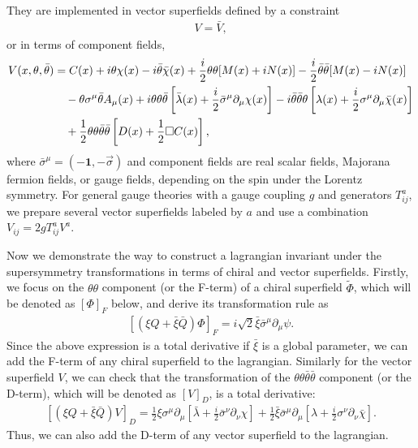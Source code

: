 \documentclass[12pt,twoside,book]{article}
\begin{document}
They are implemented in vector superfields defined by a constraint
\begin{align}
  V = \bar{V},
\end{align}
or in terms of component fields,
\begin{align}
  V(x,\theta,\bar{\theta}) &= C(x) + i\theta\chi(x) -
  i\bar{\theta}\bar{\chi}(x) + \frac{i}{2}\theta\theta [M(x) + iN(x)] -
  \frac{i}{2} \bar{\theta}\bar{\theta} [M(x) - iN(x)] \notag \\
  &\quad - \theta \sigma^\mu \bar{\theta} A_\mu(x) +
  i\theta\theta\bar{\theta} \left[ \bar{\lambda}(x) +
  \frac{i}{2}\bar{\sigma}^\mu \partial_\mu \chi(x) \right] -
  i\bar{\theta}\bar{\theta}\theta \left[ \lambda(x) + \frac{i}{2}
  \sigma^\mu \partial_\mu \bar{\chi}(x) \right] \notag \\
  &\quad + \frac{1}{2} \theta\theta\bar{\theta}\bar{\theta}\left[ D(x) +
  \frac{1}{2}\Box C(x)\right], \label{vectorsuperf}
\end{align}
where $\bar{\sigma}^\mu = (-\textbf{1},-\vec{\sigma})$ and component
fields are real scalar fields, Majorana fermion fields, or gauge
fields, depending on the spin under the Lorentz symmetry.  For general
gauge theories with a gauge coupling $g$ and generators $T^a_{i j}$, we
prepare several vector superfields labeled by $a$ and use a
combination $V_{i j} = 2gT^a_{i j} V^a$.

Now we demonstrate the way to construct a lagrangian invariant under the supersymmetry transformations in terms of chiral and vector superfields.
Firstly, we focus on the $\theta\theta$ component (or the F-term) of a chiral superfield $\tilde{\Phi}$, which will be denoted as $[\Phi]_F$ below, and derive its transformation rule as
\begin{align}
  \left[ (\xi Q + \bar{\xi} \bar{Q}) \Phi \right]_F
  = i\sqrt{2} \bar{\xi} \bar{\sigma}^\mu \partial_\mu \psi.
\end{align}
Since the above expression is a total derivative if $\bar{\xi}$ is a global parameter, we can add the F-term of any chiral superfield to the lagrangian.
Similarly for the vector superfield $V$, we can check that the transformation of the $\theta\theta\bar{\theta}\bar{\theta}$ component (or the D-term), which will be denoted as $[V]_D$, is a total derivative:
\begin{align}
  \left[ (\xi Q + \bar{\xi} \bar{Q}) V \right]_D = \frac{1}{2} \xi
  \sigma^\mu \partial_\mu \left[ \bar{\lambda} + \frac{i}{2}
  \bar{\sigma}^\nu \partial_\nu \chi \right] + \frac{1}{2} \bar{\xi}
  \bar{\sigma}^\mu \partial_\mu \left[ \lambda + \frac{i}{2} \sigma^\nu
  \partial_\nu \bar{\chi}\right].
\end{align}
Thus, we can also add the D-term of any vector superfield to the lagrangian.
\end{document}
